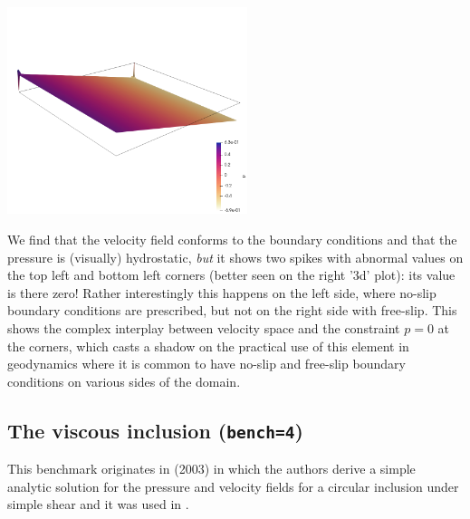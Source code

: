 \begin{center}
\includegraphics[width=7cm]{python_codes/fieldstone_161/results/bench3/press2}
\end{center}

We find that the velocity field conforms to the boundary conditions and that 
the pressure is (visually) hydrostatic, {\it but} it shows two spikes with abnormal 
values on the top left and bottom left corners (better seen on the right '3d' plot): 
its value is there zero! Rather 
interestingly this happens on the left side, where no-slip boundary 
conditions are prescribed, but not on the right side with free-slip.
{\color{red} This shows the complex interplay between velocity space and the 
constraint $p=0$ at the corners, which casts a shadow on the practical use of this element
in geodynamics where it is common to have no-slip and free-slip boundary conditions on
various sides of the domain}.

\subsection*{The viscous inclusion ({\tt bench=4})}

This benchmark originates in \textcite{scpo03} (2003) in which the 
authors derive a simple analytic solution for the pressure and 
velocity fields for a circular 
inclusion under simple shear and it was used 
in \cite{deka08,sunh10,dumg11,krhb12,gemd13}.

